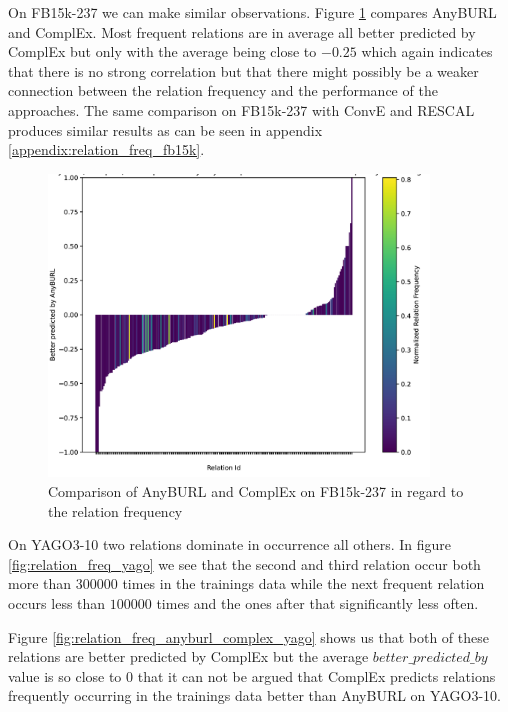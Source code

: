 On FB15k-237 we can make similar observations. Figure \ref{fig:relation_freq_anyburl_complex_fb15k} compares AnyBURL and ComplEx. Most frequent relations are in average all better predicted by ComplEx but only with the average being close to $-0.25$ which again indicates that there is no strong correlation but that there might possibly be a weaker connection between the relation frequency and the performance of the approaches. The same comparison on FB15k-237 with ConvE and RESCAL produces similar results as can be seen in appendix \ref{appendix:relation_freq_fb15k}.

\begin{figure}[H]
\centering
\includegraphics[width=0.9\textwidth]{images/relation_freq_anyburl_complex_fb15k.PNG}
\caption{Comparison of AnyBURL and ComplEx on FB15k-237 in regard to the relation frequency}
\label{fig:relation_freq_anyburl_complex_fb15k}
\end{figure}

On YAGO3-10 two relations dominate in occurrence all others. In figure \ref{fig:relation_freq_yago} we see that the second and third relation occur both more than $300000$ times in the trainings data while the next frequent relation occurs less than $100000$ times and the ones after that significantly less often. 

Figure \ref{fig:relation_freq_anyburl_complex_yago} shows us that both of these relations are better predicted by ComplEx but the average $better\_predicted\_by$ value is so close to $0$ that it can not be argued that ComplEx predicts relations frequently occurring in the trainings data better than AnyBURL on YAGO3-10.

